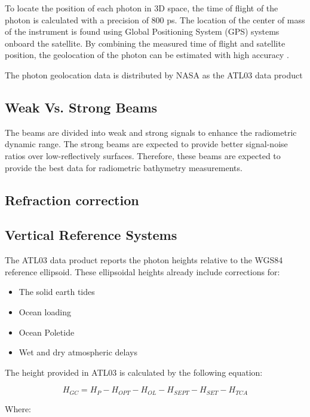 To locate the position of each photon in 3D space, the time of flight of the photon is calculated with a precision of 800 ps\parencite{Neumann2019d}. The location of the center of mass of the instrument is found using Global Positioning System (GPS) systems onboard the satellite. By combining the measured time of flight and satellite position, the geolocation of the photon can be estimated with high accuracy \parencite{Neumann2019d}.

The photon geolocation data is distributed by NASA as the ATL03 data product

\subsection{Weak Vs. Strong Beams}

The beams are divided into weak and strong signals to enhance the radiometric dynamic range. The strong beams are expected to provide better signal-noise ratios over low-reflectively surfaces.\parencite{Neumann2019d} Therefore, these beams are expected to provide the best data for radiometric bathymetry measurements.

\subsection{Refraction correction}


\subsection{Vertical Reference Systems}

The ATL03 data product reports the photon heights relative to the WGS84 reference ellipsoid. These ellipsoidal heights already include corrections for:
\begin{itemize}
      \item The solid earth tides 
      \item Ocean loading 
      \item Ocean Poletide 
      \item Wet and dry atmospheric delays
\end{itemize}
 
The height provided in ATL03 is calculated by the following equation:

\[H_{GC} =  H_{P} - H_{OPT} - H_{OL} - H_{SEPT} - H_{SET} - H_{TCA}\]

Where:

